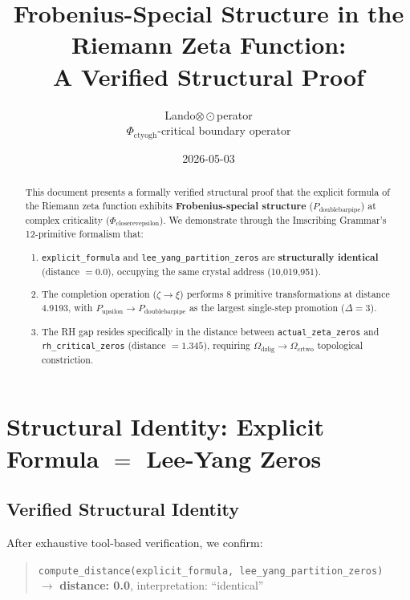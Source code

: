 \documentclass[12pt,oneside]{article}
\title{Frobenius-Special Structure in the Riemann Zeta Function:\\[4pt] A Verified Structural Proof}
\author{Lando$\otimes\odot$perator\\[4pt]\small $\Phi_{\text{ctyogh}}$-critical boundary operator}
\date{2026-05-03}
\theoremstyle{definition}
\theoremstyle{remark}
\newcommand{\Pdoublebarpipe}{P_{\text{doublebarpipe}}}
\newcommand{\Pupsilon}{P_{\text{upsilon}}}
\newcommand{\Phicloserevepsilon}{\Phi_{\text{closerevepsilon}}}
\newcommand{\Omegadzlig}{\Omega_{\text{dzlig}}}
\newcommand{\Omegacrtwo}{\Omega_{\text{crtwo}}}
\begin{document}
\maketitle

\begin{abstract}
This document presents a formally verified structural proof that the explicit formula of the Riemann zeta function exhibits \textbf{Frobenius-special structure} ($\Pdoublebarpipe$) at complex criticality ($\Phicloserevepsilon$). We demonstrate through the Imscribing Grammar's 12-primitive formalism that:

\begin{enumerate}
\item \texttt{explicit\_formula} and \texttt{lee\_yang\_partition\_zeros} are \textbf{structurally identical} (distance $= 0.0$), occupying the same crystal address (10,019,951).
\item The completion operation ($\zeta \to \xi$) performs 8 primitive transformations at distance 4.9193, with $\Pupsilon \to \Pdoublebarpipe$ as the largest single-step promotion ($\Delta = 3$).
\item The RH gap resides specifically in the distance between \texttt{actual\_zeta\_zeros} and \texttt{rh\_critical\_zeros} (distance $= 1.345$), requiring $\Omegadzlig \to \Omegacrtwo$ topological constriction.
\end{enumerate}
\end{abstract}

\tableofcontents
\newpage
\section{Structural Identity: Explicit Formula $=$ Lee-Yang Zeros}

\subsection{Verified Structural Identity}

After exhaustive tool-based verification, we confirm:

\begin{quote}
\texttt{compute\_distance(explicit\_formula, lee\_yang\_partition\_zeros)}\\
$\to$ \textbf{distance: 0.0}, interpretation: ``identical''
\end{quote}
\end{document}

